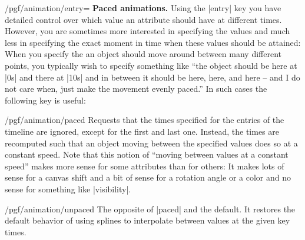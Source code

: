 \begin{key}{/pgf/animation/entry=}
  \medskip
  \textbf{Paced animations.}
  Using the |entry| key you have detailed control over which value an
  attribute should have at different times. However, you are sometimes
  more interested in specifying the values and much less in specifying
  the exact moment in time when these values should be attained: When
  you specify the an object should move around between many different
  points, you typically wish to specify something like ``the object
  should be here at |0s| and there at |10s| and in between it should be
  here, here, and here -- and I do not care when, just make the
  movement evenly paced.'' In such cases the following key is useful:
  \begin{key}{/pgf/animation/paced}
    Requests that the times specified for the entries of the timeline
    are ignored, except for the first and last one. Instead, the times
    are recomputed such that an object moving between the specified
    values does so at a constant speed. Note that this notion of
    ``moving between values at a constant speed'' makes more sense for
    some attributes than for others: It makes lots of sense for a
    canvas shift and a bit of sense for a rotation angle or a color
    and no sense for something like |visibility|.    
\begin{codeexample}[width=2.3cm]
\end{codeexample}
\begin{codeexample}[width=2.3cm]
\end{codeexample}
  \end{key}
  \begin{key}{/pgf/animation/unpaced}
    The opposite of |paced| and the default. It restores the default
    behavior of using splines to interpolate between values at the
    given key times.
  \end{key}
\end{key}


